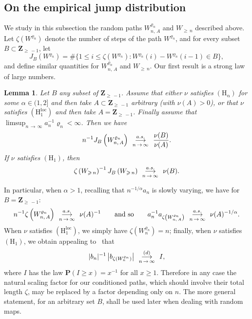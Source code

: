 \documentclass[10pt]{amsart}
\newtheorem{lemm}[theo]{Lemma}\newtheorem{prop}[theo]{Proposition}\newtheorem{coro}[theo]{Corollary}\newtheorem{conj}[theo]{Conjecture}
\theoremstyle{definition}\newtheorem{defi}[theo]{Definition}\newtheorem{rema}[theo]{Remark}\newtheorem{exam}[theo]{Example}\newtheorem{exem}[theo]{Example}\newtheorem{nota}[theo]{Notation}
\newcommand{\ensembles}[1]{\mathbf{#1}}
\newcommand{\Z}{\ensembles{Z}}
\renewcommand{\P}{\ensembles{P}}
\newcommand{\1}{\ensembles{1}}
\renewcommand{\le}{\leqslant}
\renewcommand{\ge}{\geqslant}
\newcommand{\Hrm}{\mathrm{H}}
\newcommand{\Hrmloc}{\mathrm{(H_1^{loc})}}
\newcommand{\Hrmalp}{\mathrm{(H_\alpha)}}
\newcommand{\cvloi}[1][n]{\enskip\mathop{\longrightarrow}^{(d)}_{#1\,\to\, \infty}\enskip}
\newcommand{\cvps}[1][n]{\enskip\mathop{\longrightarrow}^{a.s.}_{#1\,\to\, \infty}\enskip}
\providecommand{\?}{}
\begin{document}
\subsection{On the empirical jump distribution}\label{sec:loi_sauts_Luka_stable}

We study in this subsection the random paths $W^{\varrho_n}_{n,\,A}$ and $W_{\ge\,n}$ described above. Let $\zeta(W^{\varrho_n})$ denote the number of steps of the path $W^{\varrho_n}$, and for every subset $B \subset \Z_{\ge\,-1}$, let
\[
J_B\left(W^{\varrho_n}\right) = \#\big\{1 \le i \le \zeta\left(W^{\varrho_n}\right) : W^{\varrho_n}(i) - W^{\varrho_n}(i-1) \in B\big\},
\]
and define similar quantities for $W^{\varrho_n}_{n,\,A}$ and $W_{\ge\,n}$. Our first result is a strong law of large numbers.


\begin{lemm}\label{lem:scaling_GW}
Let $B$ any subset of $\Z_{\ge\,-1}$. Assume that either $\nu$ satisfies $\Hrmalp$ for some $\alpha \in (1, 2]$ and then take $A \subset \Z_{\ge\,-1}$ arbitrary (with $\nu(A) > 0$), or that $\nu$ satisfies $\Hrmloc$ and then take $A = \Z_{\ge\,-1}$. Finally assume that $\limsup_{n \,\to\,\infty} a_n^{-1} \varrho_n < \infty$. Then we have
\[
n^{-1} J_B\left(W^{\varrho_n}_{n,\,A}\right) \cvps \frac{\nu(B)}{\nu(A)}.
\]
If $\nu$ satisfies $(\Hrm_1)$, then
\[
\zeta\left(W_{\ge\,n}\right)^{-1} J_B\left(W_{\ge\,n}\right) \cvps \nu(B).
\]
\end{lemm}

In particular, when $\alpha > 1$, recalling that $n^{-1/\alpha} a_n$ is slowly varying, we have for $B = \Z_{\ge \,-1}$:
\[
n^{-1} \zeta\left(W^{\varrho_n}_{n,\,A}\right) \cvps \nu(A)^{-1}
\qquad\text{and so}\qquad a_n^{-1} a_{\zeta\left(W^{\varrho_n}_{n,\,A}\right)} \cvps \nu(A)^{-1/\alpha}.
\]
When $\nu$ satisfies $\Hrmloc$, we simply have $\zeta(W^{\varrho_n}_n) = n$; finally, when $\nu$ satisfies $(\Hrm_1)$, we obtain appealing to~\cite[Theorem~30]{KR19} that
\[
|b_n|^{-1} \left|b_{\zeta\left(W^{\varrho_n}_n\right)}\right| \cvloi I,
\]
where $I$ has the law $\P(I \ge x) = x^{-1}$ for all $x \ge 1$. Therefore in any case the natural scaling factor for our conditioned paths, which should involve their total length $\zeta$, may be replaced by a factor depending only on $n$. The more general statement, for an arbitrary set $B$, shall be used later when dealing with random maps.
\end{document}
